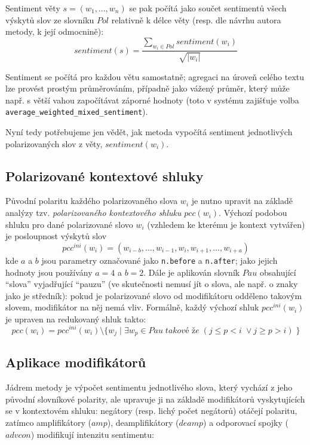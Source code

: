Sentiment věty $s = (w_1, ..., w_n)$ se pak počítá jako součet sentimentů všech výskytů slov ze slovníku $Pol$ relativně k délce věty (resp. dle návrhu autora metody, k její odmocnině):
\[
sentiment(s)=\frac{\sum_{w_{i}\in Pol} sentiment(w_i)}{\sqrt{|w_i|}}
\]

Sentiment se počítá pro každou větu samostatně; agregaci na úroveň celého textu lze provést prostým průměrováním, případně jako vážený průměr, který může např. s větší vahou započítávat záporné hodnoty (toto v systému zajišťuje volba \texttt{average\_weighted\_mixed\_sentiment}).

Nyní tedy potřebujeme jen vědět, jak metoda vypočítá sentiment jednotlivých polarizovaných slov z věty, $sentiment(w_i)$.

\subsection*{Polarizované kontextové shluky}

Původní polaritu každého polarizovaného slova $w_i$ je nutno upravit na základě analýzy tzv. \emph{polarizovaného kontextového shluku} $pcc(w_i)$.
Výchozí podobou shluku pro dané polarizované slovo $w_i$ (vzhledem ke kterému je kontext vytvářen) je posloupnost výskytů slov
\[
pcc^{ini}(w_i)=(w_{i-b}, ..., w_{i-1}, w_i, w_{i+1}, ..., w_{i+a})
\]
kde $a$ a $b$ jsou parametry označované jako \texttt{n.before} a \texttt{n.after}; jako jejich hodnoty jsou používány $a=4$ a $b=2$.
Dále je aplikován slovník $Pau$ obsahující ``slova'' vyjadřující ``pauzu'' (ve skutečnosti nemusí jít o slova, ale např. o znaky jako je středník): pokud je polarizované slovo od modifikátoru odděleno takovým slovem, modifikátor na něj nemá vliv. 
Formálně, každý výchozí shluk $pcc^{ini}(w_i)$ je upraven na redukovaný shluk takto:
\[
pcc(w_i) = pcc^{ini}(w_i) \setminus \{w_j \; | \; \exists w_p \in Pau \; \textit{takové že} \; (j \leq p < i \; \vee j \geq p > i) \; \}
\]

\subsection*{Aplikace modifikátorů}

Jádrem metody je výpočet sentimentu jednotlivého slova, který vychází z jeho původní slovníkové polarity, ale upravuje ji na základě modifikátorů vyskytujících se v kontextovém shluku: negátory (resp. lichý počet negátorů) otáčejí polaritu, zatímco amplifikátory ($amp$), deamplifikátory ($deamp$) a odporovací spojky ($advcon$) modifikují intenzitu sentimentu:

